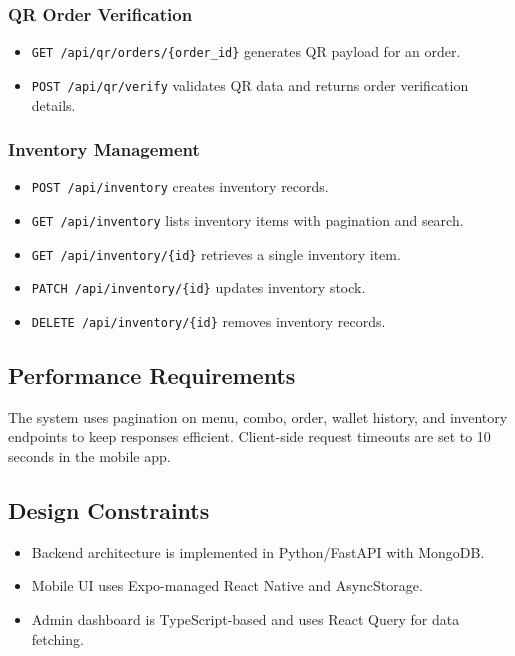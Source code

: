 \documentclass[11pt]{article}
\begin{document}
\subsubsection{QR Order Verification}
\begin{itemize}[nosep]
  \item \texttt{GET /api/qr/orders/\{order\_id\}} generates QR payload for an order.
  \item \texttt{POST /api/qr/verify} validates QR data and returns order verification details.
\end{itemize}

\subsubsection{Inventory Management}
\begin{itemize}[nosep]
  \item \texttt{POST /api/inventory} creates inventory records.
  \item \texttt{GET /api/inventory} lists inventory items with pagination and search.
  \item \texttt{GET /api/inventory/\{id\}} retrieves a single inventory item.
  \item \texttt{PATCH /api/inventory/\{id\}} updates inventory stock.
  \item \texttt{DELETE /api/inventory/\{id\}} removes inventory records.
\end{itemize}

\subsection{Performance Requirements}
The system uses pagination on menu, combo, order, wallet history, and inventory endpoints to keep responses efficient. Client-side request timeouts are set to 10 seconds in the mobile app.

\subsection{Design Constraints}
\begin{itemize}[nosep]
  \item Backend architecture is implemented in Python/FastAPI with MongoDB.
  \item Mobile UI uses Expo-managed React Native and AsyncStorage.
  \item Admin dashboard is TypeScript-based and uses React Query for data fetching.
\end{itemize}
\end{document}
